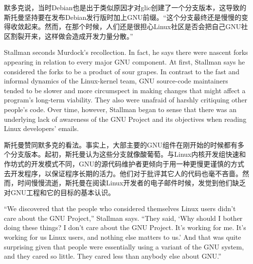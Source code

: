 \ifdefined\chs
默多克说，当时Debian也是出于类似原因才对glic创建了一个分支版本，这导致的斯托曼坚持要在发布Debian发行版时加上GNU前缀。``这个分支最终还是慢慢的变得收敛起来。然而，在那个时候，人们还是很担心Linux社区是否会把自己GNU社区割裂开来，这样做会造成开发力量分散。''
\fi

\ifdefined\eng
Stallman seconds Murdock's recollection. In fact, he says there were nascent forks appearing in relation to every major GNU component. At first, Stallman says he considered the forks to be a product of sour grapes. In contrast to the fast and informal dynamics of the Linux-kernel team, GNU source-code maintainers tended to be slower and more circumspect in making changes that might affect a program's long-term viability. They also were unafraid of harshly critiquing other people's code. Over time, however, Stallman began to sense that there was an underlying lack of awareness of the GNU Project and its objectives when reading Linux developers' emails.
\fi

\ifdefined\chs
斯托曼赞同默多克的看法。事实上，大部主要的GNU组件在刚开始的时候都有多个分支版本。起初，斯托曼认为这些分支就像酸葡萄。与Linux内核开发组快速和作坊式的开发模式不同，GNU的源代码维护者更倾向于用一种更慢更谨慎的方式去开发程序，以保证程序长期的活力。他们对于批评其它人的代码也毫不吝啬。然而，时间慢慢流逝，斯托曼在阅读Linux开发者的电子邮件时候，发觉到他们缺乏对GNU工程和它的目标的基本认识。
\fi



\ifdefined\eng
``We discovered that the people who considered themselves Linux users didn't care about the GNU Project,'' Stallman says. ``They said, `Why should I bother doing these things? I don't care about the GNU Project. It's working for me. It's working for us Linux users, and nothing else matters to us.' And that was quite surprising given that people were essentially using a variant of the GNU system, and they cared so little. They cared less than anybody else about GNU.''
\fi

